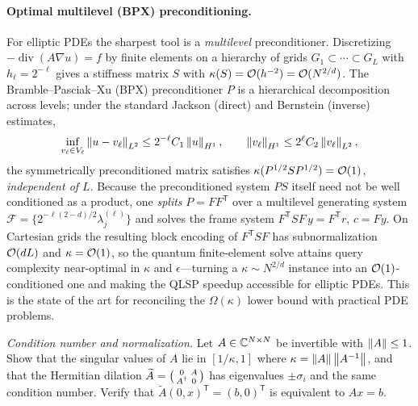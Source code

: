 \paragraph{Optimal multilevel (BPX) preconditioning.}
For elliptic PDEs the sharpest tool is a \emph{multilevel} preconditioner. Discretizing
$-\operatorname{div}(A\nabla u)=f$ by finite elements on a hierarchy of grids
$G_1\subset\cdots\subset G_L$ with $h_\ell=2^{-\ell}$ gives a stiffness matrix $S$ with
$\kappa(S)=\mathcal{O}(h^{-2})=\mathcal{O}(N^{2/d})$. The Bramble--Pasciak--Xu (BPX) preconditioner
$P$ is a hierarchical decomposition across levels; under the standard Jackson (direct)
and Bernstein (inverse) estimates,
\begin{equation}
  \inf_{v_\ell\in V_\ell}\left\lVert u-v_\ell \right\rVert_{L^2}\le 2^{-\ell}C_1\left\lVert u \right\rVert_{H^1},\qquad
  \left\lVert v_\ell \right\rVert_{H^1}\le 2^{\ell}C_2\left\lVert v_\ell \right\rVert_{L^2},
  \label{eq:lec10-jackson-bernstein}
\end{equation}
the symmetrically preconditioned matrix satisfies $\kappa(P^{1/2}SP^{1/2})=\mathcal{O}(1)$,
\emph{independent of $L$}. Because the preconditioned system $PS$ itself need not be well
conditioned as a product, one \emph{splits} $P=FF^{\mathsf T}$ over a multilevel
generating system $\mathcal F=\{2^{-\ell(2-d)/2}\lambda_j^{(\ell)}\}$ and solves the
frame system $F^{\mathsf T}SF\,y=F^{\mathsf T}r$, $c=Fy$. On Cartesian grids the
resulting block encoding of $F^{\mathsf T}SF$ has subnormalization $\mathcal{O}(dL)$ and
$\kappa=\mathcal{O}(1)$, so the quantum finite-element solve attains query complexity
near-optimal in $\kappa$ and $\epsilon$---turning a $\kappa\sim N^{2/d}$ instance into an
$\mathcal{O}(1)$-conditioned one and making the QLSP speedup accessible for elliptic PDEs. This
is the state of the art for reconciling the $\Omega(\kappa)$ lower bound with practical
PDE problems.

\exercisesection

\begin{exercise}\label{ex:lec10-1}
\emph{Condition number and normalization.} Let $A\in\mathbb{C}^{N\times N}$ be invertible with
$\left\lVert A \right\rVert\le1$. Show that the singular values of $A$ lie in $[1/\kappa,1]$ where
$\kappa=\left\lVert A \right\rVert\left\lVert A^{-1} \right\rVert$, and that the Hermitian dilation
$\widetilde A=\bigl(\begin{smallmatrix}0&A\\ A^{\dagger}&0\end{smallmatrix}\bigr)$ has
eigenvalues $\pm\sigma_i$ and the same condition number. Verify that
$\widetilde A(0,x)^{\mathsf T}=(b,0)^{\mathsf T}$ is equivalent to $Ax=b$.
\end{exercise}

